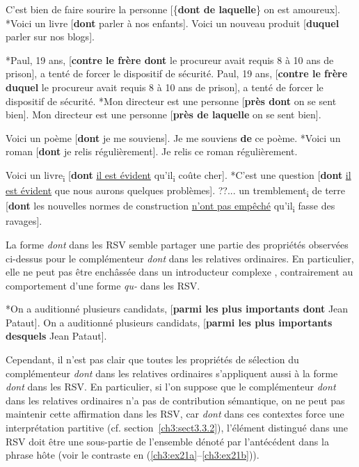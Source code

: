 \ea \label{ch3:ex16}
\ea
C’est bien de faire sourire la personne [\{\textbf{dont {\textbar} de laquelle}\} on est amoureux]. \label{ch3:ex16a}
\ex 
*Voici un livre [\textbf{dont} parler à nos enfants]. \label{ch3:ex16b}
\ex 
Voici un nouveau produit [\textbf{duquel} parler sur nos blogs]. \label{ch3:ex16c}
\z
\z

\ea \label{ch3:ex17}
\ea
*Paul, 19 ans, [\textbf{contre le frère dont} le procureur avait requis 8 à 10 ans de prison], a tenté de forcer le dispositif de sécurité. \label{ch3:ex17a}
\ex
Paul, 19 ans, [\textbf{contre le frère duquel} le procureur avait requis 8 à 10 ans de prison], a tenté de forcer le dispositif de sécurité. \label{ch3:ex17b}
\ex 
*Mon directeur est une personne [\textbf{près dont} on se sent bien]. \label{ch3:ex17c}
\ex 
Mon directeur est une personne [\textbf{près de laquelle} on se sent bien]. \label{ch3:ex17d}
\z 
\z 

\ea \label{ch3:ex18}
\ea
Voici un poème [\textbf{dont} je me souviens]. \label{ch3:ex18a}
\ex 
Je me souviens \textbf{de} ce poème. \label{ch3:ex18b}
\ex 
*Voici un roman [\textbf{dont} je relis régulièrement]. \label{ch3:ex18c}
\ex 
Je relis ce roman régulièrement. \label{ch3:ex18d}
\z 
\z 

\ea \label{ch3:ex19}
\ea
Voici un livre\textsubscript{i} [\textbf{dont} \uline{il est évident} qu’il\textsubscript{i} coûte cher]. \label{ch3:ex19a}
\ex 
*C’est une question [\textbf{dont} \uline{il est évident} que nous aurons quelques problèmes]. \label{ch3:ex19b}
\ex 
??... un tremblement\textsubscript{i} de terre [\textbf{dont} les nouvelles normes de construction \uline{n’ont pas empêché} qu’il\textsubscript{i} fasse des ravages]. \label{ch3:ex19c}
\z 
\z 

La forme \textit{dont} dans les RSV semble partager une partie des propriétés observées ci-dessus pour le complémenteur \textit{dont} dans les relatives ordinaires. En particulier, elle ne peut pas être enchâssée dans un introducteur complexe , contrairement au comportement d’une forme \textit{qu-}  dans les RSV.

\ea \label{ch3:ex20}
\ea
*On a auditionné plusieurs candidats, [\textbf{parmi les plus importants dont} Jean Pataut]. \label{ch3:ex20a}
\ex
On a auditionné plusieurs candidats, [\textbf{parmi les plus importants desquels} Jean Pataut]. \label{ch3:ex20b}
\z 
\z 

Cependant, il n’est pas clair que toutes les propriétés de sélection du complémenteur \textit{dont} dans les relatives ordinaires s’appliquent aussi à la forme \textit{dont} dans les RSV. En particulier, si l’on suppose que le complémenteur \textit{dont} dans les relatives ordinaires n’a pas de contribution sémantique, on ne peut pas maintenir cette affirmation dans les RSV, car \textit{dont} dans ces contextes force une interprétation partitive (cf. section~\ref{ch3:sect3.3.2}), {\cad} l’élément distingué dans une RSV doit être une sous-partie de l’ensemble dénoté par l’antécédent dans la phrase hôte (voir le contraste en (\ref{ch3:ex21a}--\ref{ch3:ex21b})).  

